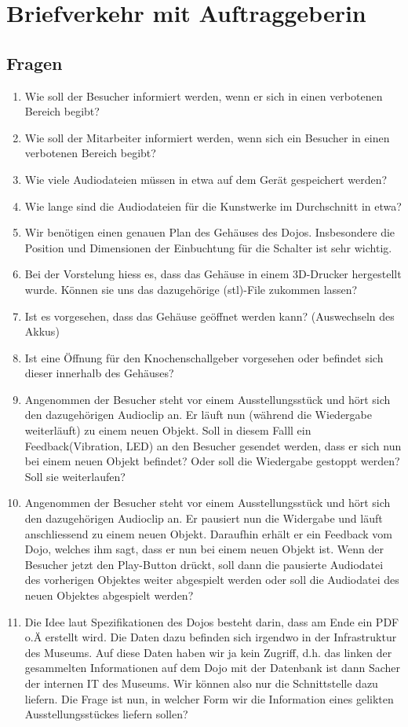 \section{Briefverkehr mit Auftraggeberin}
\label{Briefverkehr mit Auftraggeberin}

\subsection*{Fragen}
\begin{enumerate} 
\item Wie soll der Besucher informiert werden, wenn er sich in einen verbotenen Bereich begibt?
\item Wie soll der Mitarbeiter informiert werden, wenn sich ein Besucher in einen verbotenen Bereich begibt?
\item Wie viele Audiodateien müssen in etwa auf dem Gerät gespeichert werden?
\item Wie lange sind die Audiodateien für die Kunstwerke im Durchschnitt in etwa?
\item Wir benötigen einen genauen Plan des Gehäuses des Dojos. Insbesondere die Position und Dimensionen der Einbuchtung für die Schalter ist sehr wichtig.
\item Bei der Vorstelung hiess es, dass das Gehäuse in einem 3D-Drucker hergestellt wurde. Können sie uns das dazugehörige (stl)-File zukommen lassen?
\item Ist es vorgesehen, dass das Gehäuse geöffnet werden kann? (Auswechseln des Akkus)
\item Ist eine Öffnung für den Knochenschallgeber vorgesehen oder befindet sich dieser innerhalb des Gehäuses?
\item Angenommen der Besucher steht vor einem Ausstellungsstück und hört sich den dazugehörigen Audioclip an. Er läuft nun (während die Wiedergabe weiterläuft) zu einem neuen Objekt. Soll in diesem Falll ein Feedback(Vibration, LED) an den Besucher gesendet werden, dass er sich nun bei einem neuen Objekt befindet? Oder soll die Wiedergabe gestoppt werden? Soll sie weiterlaufen?
\item Angenommen der Besucher steht vor einem Ausstellungsstück und hört sich den dazugehörigen Audioclip an. Er pausiert nun die Widergabe und läuft anschliessend zu einem neuen Objekt. Daraufhin erhält er ein Feedback vom Dojo, welches ihm sagt, dass er nun bei einem neuen Objekt ist. Wenn der Besucher jetzt den Play-Button drückt, soll dann die pausierte Audiodatei des vorherigen Objektes weiter abgespielt werden oder soll die Audiodatei des neuen Objektes abgespielt werden?
\item Die Idee laut Spezifikationen des Dojos besteht darin, dass am Ende ein PDF o.Ä erstellt wird. Die Daten dazu befinden sich irgendwo in der Infrastruktur des Museums. Auf diese Daten haben wir ja kein Zugriff, d.h. das linken der gesammelten Informationen auf dem Dojo mit der Datenbank ist dann Sacher der internen IT des Museums. Wir können also nur die Schnittstelle dazu liefern. Die Frage ist nun, in welcher Form wir die Information eines gelikten Ausstellungsstückes liefern sollen?
\end{enumerate}

